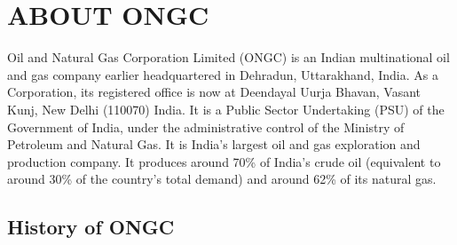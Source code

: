 \chapter{ABOUT ONGC}

\onehalfspacing 

Oil and Natural Gas Corporation Limited (ONGC) is an Indian multinational oil and gas company earlier headquartered in Dehradun, Uttarakhand, India. As a Corporation, its registered office is now at Deendayal Uurja Bhavan, Vasant Kunj, New Delhi (110070) India. It is a Public Sector Undertaking (PSU) of the
Government of India, under the administrative control of the Ministry of Petroleum and Natural Gas. It is India's largest oil and gas exploration and production company. It produces around 70\% of India's crude oil (equivalent to around 30\% of the country's total demand) and around 62\% of its natural gas.

\section*{History of ONGC}

